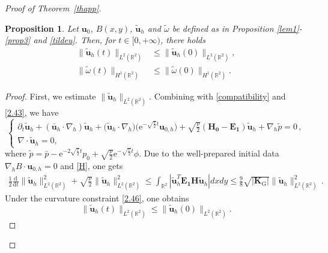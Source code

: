 \documentclass[pdflatex,sn-mathphys-num]{sn-jnl}%
\theoremstyle{thmstyleone}%
\newtheorem{proposition}[theorem]{Proposition}%
\theoremstyle{thmstyletwo}%
\theoremstyle{thmstylethree}%
\theoremstyle{thmstyletwo}
\begin{document}
\begin{proof}[Proof of Theorem~{\upshape\ref{thapp}}]
\begin{proposition}\label{propT}
	Let ${\boldsymbol{u}}_{0}$, $B(x,y)$, $\tilde{\boldsymbol{u}}_h$ and $\tilde{\omega}$ be defined as in Proposition \ref{lem1}-\ref{prop3} and \eqref{tildeu}. Then, for $t \in [0,+\infty)$, there holds
	\begin{align}
		\lVert
		\tilde{\boldsymbol{u}}_h(t)\rVert_{{L}^{2}(\mathbb{R}^2)}&\leq
		\lVert
		\tilde{\boldsymbol{u}}_h(0)\rVert_{{L}^{2}(\mathbb{R}^2)},\label{n22}\\
		\lVert\tilde{\omega}(t)\rVert_{H^1(\mathbb{R}^2)} &\leq
	\lVert\tilde{\omega}(0)\rVert_{H^1(\mathbb{R}^2)}.\label{n23}
	\end{align}
\end{proposition}
\begin{proof}
	First, we estimate $\lVert
	\tilde{\boldsymbol{u}}_h
	\rVert_{{L}^{2}(\mathbb{R}^2)}$. Combining with \eqref{compatibility} and \eqref{2.43}, we have
	\begin{equation}\label{n5}
		\begin{cases}
			\partial_{t}\tilde{\boldsymbol{u}}_h+(\bar {\boldsymbol u}_h \cdot \nabla_h) \tilde{\boldsymbol{u}}_h
			+\big(\tilde{\boldsymbol{u}}_h\cdot\nabla_{ h}\big)\big(\mathrm{e}^{-\sqrt{\frac\nu2}t}{\boldsymbol{u}}_{0,h}\big)
			+\sqrt{\tfrac{\nu}{2}}
			(\boldsymbol{H_0}
			-\boldsymbol{E_1})
			\tilde{\boldsymbol{u}}_h
			+\nabla_h \tilde{p} =0\,,\\
			\nabla\cdot \tilde{\boldsymbol{u}}_h=0,
		\end{cases}
	\end{equation}
	where $\tilde{p}=\bar{p}-\mathrm{e}^{-2\sqrt{\frac\nu2}t}p_0+\sqrt{\tfrac{\nu}{2}}\mathrm{e}^{-\sqrt{\frac\nu2}t}\phi$.
	Due to the well-prepared initial data $\nabla_{ h}B\cdot{\boldsymbol{u}}_{0,h}=0$ and \eqref{H}, one gets
	\begin{align}\label{n6}
		\frac{1}{2}\frac{\mathrm{d}}{\mathrm{d}t}\|\tilde{\boldsymbol{u}}_h\|^2_{{L}^2(\mathbb{R}^2)}
		+\sqrt{\tfrac\nu2}\|\tilde{\boldsymbol{u}}_h\|^2_{{L}^2(\mathbb{R}^2)}
		\leq
		\int_{\mathbb{R}^2}
		|\tilde{\boldsymbol{u}}_h^T
		\boldsymbol{E_1}\boldsymbol{H}\tilde{\boldsymbol{u}}_h|
		{d}x{d}y
		\leq\tfrac98\sqrt{|\boldsymbol{K}_{\mathrm{G}}|}\|\tilde{\boldsymbol{u}}_h\|^2_{{L}^2(\mathbb{R}^2)}\,.
	\end{align}
	Under the curvature constraint \eqref{2.46}, one obtains
	\begin{equation}\label{n8}
		\|\tilde{\boldsymbol{u}}_h(t)\|_{{L}^2(\mathbb{R}^2)}\leq
		\|\tilde{\boldsymbol{u}}_h(0)\|_{{L}^2(\mathbb{R}^2)}.
	\end{equation}
	

\end{proof}
\end{proof}
\end{document}
